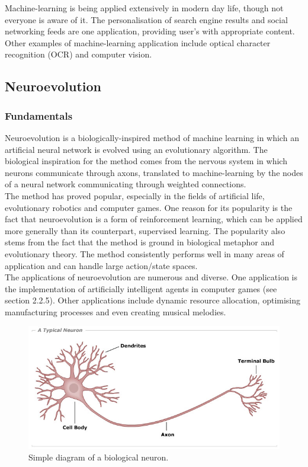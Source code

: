 \documentclass[11pt,a4paper]{article}
\begin{document}
Machine-learning is being applied extensively in modern day life, though not everyone is aware of it. The personalisation of search engine results and social networking feeds are one application, providing user's with appropriate content. \cite{search} Other examples of machine-learning application include optical character recognition (OCR) and computer vision. \cite{ocr}
\newpage
\subsection{Neuroevolution}
\subsubsection{Fundamentals}
Neuroevolution is a biologically-inspired method of machine learning in which an artificial neural network is evolved using an evolutionary algorithm. The biological inspiration for the method comes from the nervous system in which neurons communicate through axons, translated to machine-learning by the nodes of a neural network communicating through weighted connections.\\

The method has proved popular, especially in the fields of artificial life, evolutionary robotics and computer games. One reason for its popularity is the fact that neuroevolution is a form of reinforcement learning, which can be applied more generally than its counterpart, supervised learning. The popularity also stems from the fact that the method is ground in biological metaphor and evolutionary theory. The method consistently performs well in many areas of application and can handle large action/state spaces. \cite{risi}\\

The applications of neuroevolution are numerous and diverse. One application is the implementation of artificially intelligent agents in computer games (see section 2.2.5). Other applications include dynamic resource allocation, optimising manufacturing processes and even creating musical melodies. \cite{neapps}
\begin{figure}[h]
\includegraphics[width=\textwidth]{neuron}
\caption{Simple diagram of a biological neuron.}
\end{figure}
\newpage
\end{document}

